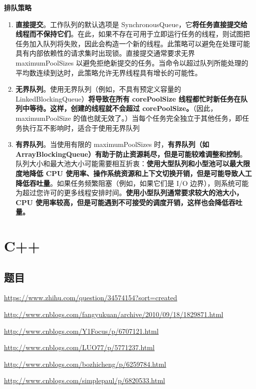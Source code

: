 \documentclass[UTF8,a4paper,8pt]{ctexart}
\begin{document}
			\textbf{排队策略}
				\begin{enumerate}
					\item \textbf{直接提交}。工作队列的默认选项是 SynchronousQueue，它\textbf{将任务直接提交给线程而不保持它们}。在此，如果不存在可用于立即运行任务的线程，则试图把任务加入队列将失败，因此会构造一个新的线程。此策略可以避免在处理可能具有内部依赖性的请求集时出现锁。直接提交通常要求无界 maximumPoolSizes 以避免拒绝新提交的任务。当命令以超过队列所能处理的平均数连续到达时，此策略允许无界线程具有增长的可能性。 
					
					\item \textbf{无界队列}。使用无界队列（例如，不具有预定义容量的 LinkedBlockingQueue）\textbf{将导致在所有 corePoolSize 线程都忙时新任务在队列中等待。这样，创建的线程就不会超过 corePoolSize。}（因此，maximumPoolSize 的值也就无效了。）当每个任务完全独立于其他任务，即任务执行互不影响时，适合于使用无界队列 
					
					\item  \textbf{有界队列}。当使用有限的 maximumPoolSizes 时，\textbf{有界队列（如 ArrayBlockingQueue）有助于防止资源耗尽，但是可能较难调整和控制}。队列大小和最大池大小可能需要相互折衷：\textbf{使用大型队列和小型池可以最大限度地降低 CPU 使用率、操作系统资源和上下文切换开销，但是可能导致人工降低吞吐量}。如果任务频繁阻塞（例如，如果它们是 I/O 边界），则系统可能为超过您许可的更多线程安排时间。\textbf{使用小型队列通常要求较大的池大小，CPU 使用率较高，但是可能遇到不可接受的调度开销，这样也会降低吞吐量。}
				\end{enumerate}
				
			
		
\newpage
\section{C++}
	\subsection{题目}
		\url{https://www.zhihu.com/question/34574154?sort=created}
	
		\url{http://www.cnblogs.com/fangyukuan/archive/2010/09/18/1829871.html}
		
		\url{http://www.cnblogs.com/Y1Focus/p/6707121.html}
		
		\url{http://www.cnblogs.com/LUO77/p/5771237.html}
		
		\url{http://www.cnblogs.com/bozhicheng/p/6259784.html}

		\url{http://www.cnblogs.com/simplepaul/p/6820533.html}
\end{document}
